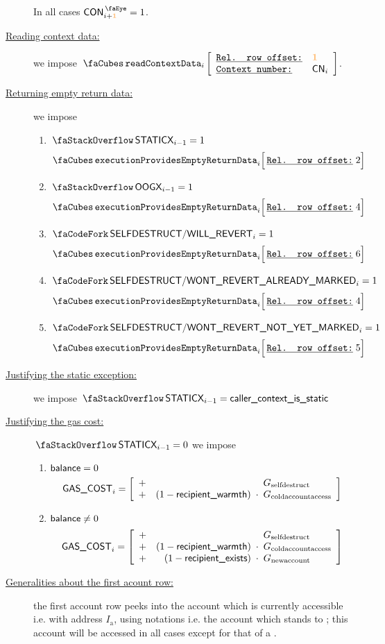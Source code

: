 \begin{description}
		\saNote{} In all cases $\peekContext  _{i + \locFirstContextRow} = 1$.
	\item[\underline{Reading context data:}]
		we impose $\readContextData {i}{\locFirstContextRow}{\cn_{i}}$.
	\item[\underline{Returning empty return data:}]
		we impose
		\begin{enumerate}
			\item \If $\stackStaticx_{i - 1} = 1$                        \Then \[ \executionProvidesEmptyReturnData {i}{2}  \]
			\item \If $\stackOogx_{i - 1} = 1$                           \Then \[ \executionProvidesEmptyReturnData {i}{4}  \]
			\item \If $\scenSelfdestructWillRevert_{i} = 1$              \Then \[ \executionProvidesEmptyReturnData {i}{6}  \]
			\item \If $\scenSelfdestructWontRevertAlreadyMarked_{i} = 1$ \Then \[ \executionProvidesEmptyReturnData {i}{4}  \]
			\item \If $\scenSelfdestructWontRevertNotYetMarked_{i} = 1$  \Then \[ \executionProvidesEmptyReturnData {i}{5}  \]
		\end{enumerate}
	\item[\underline{Justifying the static exception:}]
		we impose $\stackStaticx_{i - 1} = \locIsStatic$
	\item[\underline{Justifying the gas cost:}]
		\If $\stackStaticx_{i - 1} = 0$ \Then we impose
		\begin{enumerate}
			\item \If $\textsf{balance} =    0$ \Then
				\[
					\gasCost_{i} =
					\left[ \begin{array}{crcl}
						+ &                           & \!\!\!       \!\!\! & G_\text{selfdestruct}      \\
						+ & (1 - \locRecipientWarmth) & \!\!\! \cdot \!\!\! & G_\text{coldaccountaccess} \\
					\end{array} \right]
				\]
			\item \If $\textsf{balance} \neq 0$ \Then
				\[
					\gasCost_{i} =
					\left[ \begin{array}{crcl}
						+ &                           & \!\!\!       \!\!\! & G_\text{selfdestruct}      \\
						+ & (1 - \locRecipientWarmth) & \!\!\! \cdot \!\!\! & G_\text{coldaccountaccess} \\
						+ & (1 - \locRecipientExists) & \!\!\! \cdot \!\!\! & G_\text{newaccount}        \\
					\end{array} \right]
				\]
		\end{enumerate}
	\item[\underline{Generalities about the first acount row:}]
		the first account row peeks into the account which is currently accessible i.e. with address $I_\text{a}$, using \cite{EYP} notations i.e. the account which stands to ;
		this account will be accessed in all cases except for that of a \staticxSH{}.


\end{description}
